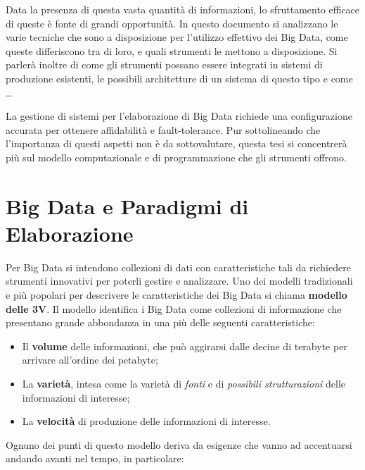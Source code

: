 \documentclass[italian,a4paper, twoside, 12pt]{report}
\providecommand{\tightlist}{%
  \setlength{\itemsep}{0pt}\setlength{\parskip}{0pt}}
\begin{document}
Data la presenza di questa vasta quantità di informazioni, lo
sfruttamento efficace di queste è fonte di grandi opportunità. In questo
documento si analizzano le varie tecniche che sono a disposizione per
l'utilizzo effettivo dei Big Data, come queste differiscono tra di loro,
e quali strumenti le mettono a disposizione. Si parlerà inoltre di come
gli strumenti possano essere integrati in sistemi di produzione
esistenti, le possibili architetture di un sistema di questo tipo e come
\ldots{}

La gestione di sistemi per l'elaborazione di Big Data richiede una
configurazione accurata per ottenere affidabilità e fault-tolerance. Pur
sottolineando che l'importanza di questi aspetti non è da sottovalutare,
questa tesi si concentrerà più sul modello computazionale e di
programmazione che gli strumenti offrono.

\chapter{Big Data e Paradigmi di
Elaborazione}\label{big-data-e-paradigmi-di-elaborazione}

Per Big Data si intendono collezioni di dati con caratteristiche tali da
richiedere strumenti innovativi per poterli gestire e analizzare. Uno
dei modelli tradizionali e più popolari per descrivere le
caratteristiche dei Big Data si chiama \textbf{modello delle 3V}. Il
modello identifica i Big Data come collezioni di informazione che
presentano grande abbondanza in una più delle seguenti caratteristiche:

\begin{itemize}
\tightlist
\item
  Il \textbf{volume} delle informazioni, che può aggirarsi dalle decine
  di terabyte per arrivare all'ordine dei petabyte;
\item
  La \textbf{varietà}, intesa come la varietà di \emph{fonti} e di
  \emph{possibili strutturazioni} delle informazioni di interesse;
\item
  La \textbf{velocità} di produzione delle informazioni di interesse.
\end{itemize}

Ognuno dei punti di questo modello deriva da esigenze che vanno ad
accentuarsi andando avanti nel tempo, in particolare:
\end{document}
